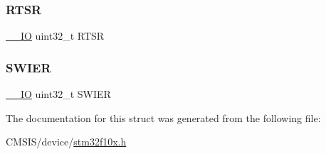 \mbox{\label{struct_e_x_t_i___type_def_a0d952a17455687d6e9053730d028fa1d}} 
\subsubsection{\texorpdfstring{RTSR}{RTSR}}
{\footnotesize\ttfamily \mbox{\hyperlink{core__sc300_8h_aec43007d9998a0a0e01faede4133d6be}{\+\_\+\+\_\+\+IO}} uint32\+\_\+t R\+T\+SR}

\mbox{\label{struct_e_x_t_i___type_def_a9eae93b6cc13d4d25e12f2224e2369c9}} 
\subsubsection{\texorpdfstring{SWIER}{SWIER}}
{\footnotesize\ttfamily \mbox{\hyperlink{core__sc300_8h_aec43007d9998a0a0e01faede4133d6be}{\+\_\+\+\_\+\+IO}} uint32\+\_\+t S\+W\+I\+ER}



The documentation for this struct was generated from the following file\+:\begin{DoxyCompactItemize}
\item 
C\+M\+S\+I\+S/device/\mbox{\hyperlink{stm32f10x_8h}{stm32f10x.\+h}}\end{DoxyCompactItemize}
